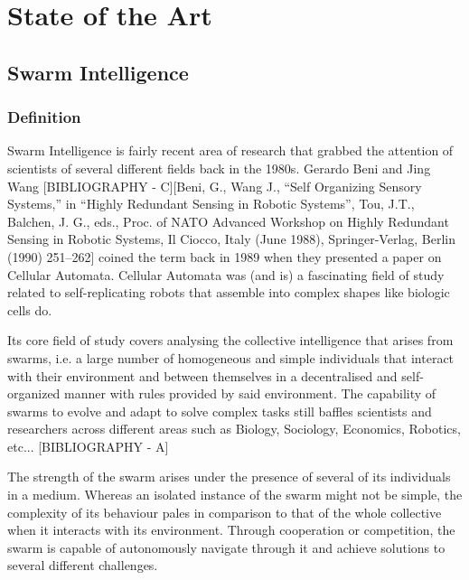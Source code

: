
\chapter{State of the Art}
\label{estadoarte}

\section{Swarm Intelligence}
\subsection{Definition}
Swarm Intelligence is fairly recent area of research that grabbed the attention of scientists of several different fields back in the 1980s. Gerardo Beni and Jing Wang [BIBLIOGRAPHY - C][Beni, G., Wang J., “Self Organizing Sensory Systems,” in “Highly Redundant Sensing in Robotic Systems”, Tou, J.T., Balchen, J. G., eds., Proc. of NATO Advanced Workshop on Highly Redundant Sensing in Robotic Systems, Il Ciocco, Italy (June 1988), Springer-Verlag, Berlin (1990) 251–262] coined the term back in 1989 when they presented a paper on Cellular Automata. Cellular Automata was (and is) a fascinating field of study related to self-replicating robots that assemble into complex shapes like biologic cells do.

Its core field of study covers analysing the collective intelligence that arises from swarms, i.e. a large number of homogeneous and simple individuals that interact with their environment and between themselves in a decentralised and self-organized manner with rules provided by said environment. The capability of swarms to evolve and adapt to solve complex tasks still baffles scientists and researchers across different areas such as Biology, Sociology, Economics, Robotics, etc... [BIBLIOGRAPHY - A]

The strength of the swarm arises under the presence of several of its individuals in a medium. Whereas an isolated instance of the swarm might not be simple, the complexity of its behaviour pales in comparison to that of the whole collective when it interacts with its environment. Through cooperation or competition, the swarm is capable of autonomously navigate through it and achieve solutions to several different challenges.

